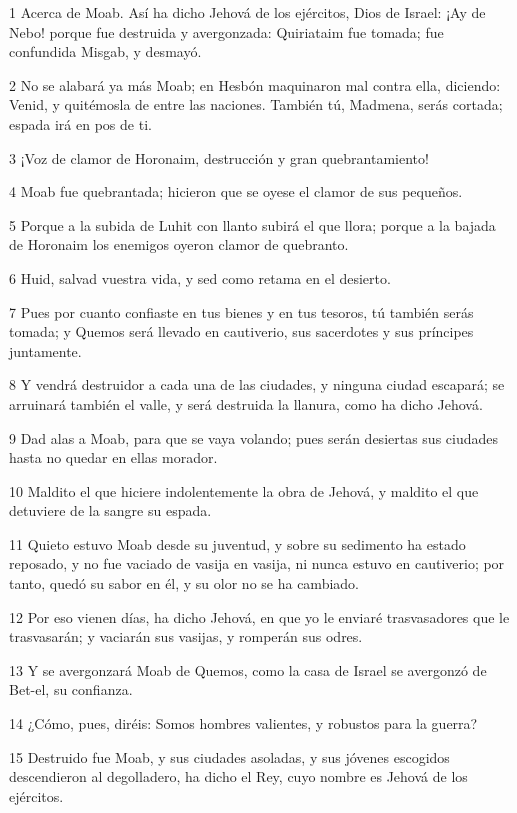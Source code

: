 \par 1 Acerca de Moab. Así ha dicho Jehová de los ejércitos, Dios de Israel: ¡Ay de Nebo! porque fue destruida y avergonzada: Quiriataim fue tomada; fue confundida Misgab, y desmayó.
\par 2 No se alabará ya más Moab; en Hesbón maquinaron mal contra ella, diciendo: Venid, y quitémosla de entre las naciones. También tú, Madmena, serás cortada; espada irá en pos de ti.
\par 3 ¡Voz de clamor de Horonaim, destrucción y gran quebrantamiento! 
\par 4 Moab fue quebrantada; hicieron que se oyese el clamor de sus pequeños.
\par 5 Porque a la subida de Luhit con llanto subirá el que llora; porque a la bajada de Horonaim los enemigos oyeron clamor de quebranto.
\par 6 Huid, salvad vuestra vida, y sed como retama en el desierto.
\par 7 Pues por cuanto confiaste en tus bienes y en tus tesoros, tú también serás tomada; y Quemos será llevado en cautiverio, sus sacerdotes y sus príncipes juntamente.
\par 8 Y vendrá destruidor a cada una de las ciudades, y ninguna ciudad escapará; se arruinará también el valle, y será destruida la llanura, como ha dicho Jehová.
\par 9 Dad alas a Moab, para que se vaya volando; pues serán desiertas sus ciudades hasta no quedar en ellas morador.
\par 10 Maldito el que hiciere indolentemente la obra de Jehová, y maldito el que detuviere de la sangre su espada.
\par 11 Quieto estuvo Moab desde su juventud, y sobre su sedimento ha estado reposado, y no fue vaciado de vasija en vasija, ni nunca estuvo en cautiverio; por tanto, quedó su sabor en él, y su olor no se ha cambiado.
\par 12 Por eso vienen días, ha dicho Jehová, en que yo le enviaré trasvasadores que le trasvasarán; y vaciarán sus vasijas, y romperán sus odres.
\par 13 Y se avergonzará Moab de Quemos, como la casa de Israel se avergonzó de Bet-el, su confianza.
\par 14 ¿Cómo, pues, diréis: Somos hombres valientes, y robustos para la guerra?
\par 15 Destruido fue Moab, y sus ciudades asoladas, y sus jóvenes escogidos descendieron al degolladero, ha dicho el Rey, cuyo nombre es Jehová de los ejércitos.
